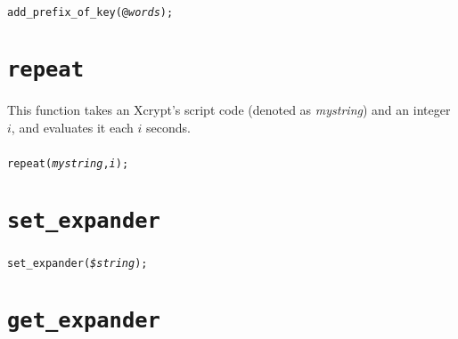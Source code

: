 \documentclass[a4paper,10pt]{report}
\begin{document}
\begin{boxnote}
\begin{alltt}
add_prefix_of_key(@\textit{words});
\end{alltt}
\end{boxnote}
\vspace{\baselineskip}

\section{\texttt{repeat}}

This function takes an Xcrypt's script code (denoted as
\textit{mystring}) and an integer $i$, and evaluates it each $i$ seconds.

\subsubsection{\format}

\begin{boxnote}
\begin{alltt}
repeat(\textit{mystring}, \textit{i});
\end{alltt}
\end{boxnote}
\vspace{\baselineskip}


\section{\texttt{set\_expander}}

\subsubsection{\format}

\begin{boxnote}
\begin{alltt}
set_expander(\textit{\$string});
\end{alltt}
\end{boxnote}
\vspace{\baselineskip}

\section{\texttt{get\_expander}}

\subsubsection{\format}
\end{document}
